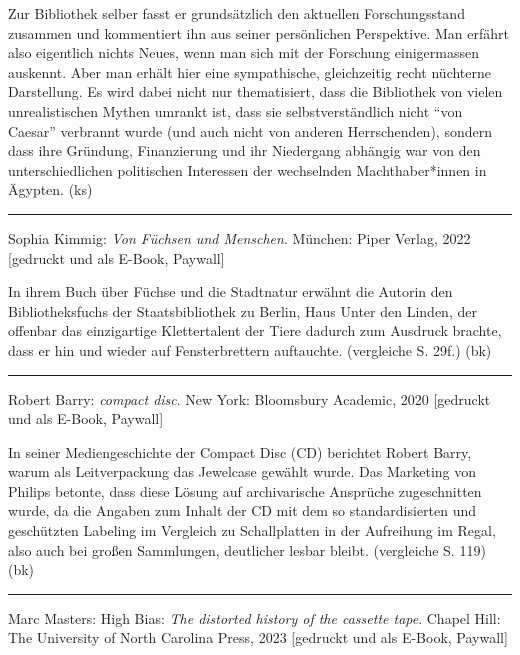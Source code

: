 \documentclass[a4paper,
fontsize=11pt,
oneside,
numbers=noperiodatend,
parskip=half-,
bibliography=totoc,
final
]{scrartcl}
\begin{document}
Zur Bibliothek selber fasst er grundsätzlich den aktuellen
Forschungsstand zusammen und kommentiert ihn aus seiner persönlichen
Perspektive. Man erfährt also eigentlich nichts Neues, wenn man sich mit
der Forschung einigermassen auskennt. Aber man erhält hier eine
sympathische, gleichzeitig recht nüchterne Darstellung. Es wird dabei
nicht nur thematisiert, dass die Bibliothek von vielen unrealistischen
Mythen umrankt ist, dass sie selbstverständlich nicht \enquote{von
Caesar} verbrannt wurde (und auch nicht von anderen Herrschenden),
sondern dass ihre Gründung, Finanzierung und ihr Niedergang abhängig war
von den unterschiedlichen politischen Interessen der wechselnden
Machthaber*innen in Ägypten. (ks)

\begin{center}\rule{0.5\linewidth}{0.5pt}\end{center}

Sophia Kimmig: \emph{Von Füchsen und Menschen}. München: Piper Verlag,
2022 {[}gedruckt und als E-Book, Paywall{]}

In ihrem Buch über Füchse und die Stadtnatur erwähnt die Autorin den
Bibliotheksfuchs der Staatsbibliothek zu Berlin, Haus Unter den Linden,
der offenbar das einzigartige Klettertalent der Tiere dadurch zum
Ausdruck brachte, dass er hin und wieder auf Fensterbrettern auftauchte.
(vergleiche S. 29f.) (bk)

\begin{center}\rule{0.5\linewidth}{0.5pt}\end{center}

Robert Barry: \emph{compact disc}. New York: Bloomsbury Academic, 2020 {[}gedruckt und als E-Book, Paywall{]}

In seiner Mediengeschichte der Compact Disc (CD) berichtet Robert Barry,
warum als Leitverpackung das Jewelcase gewählt wurde. Das Marketing von
Philips betonte, dass diese Lösung auf archivarische Ansprüche
zugeschnitten wurde, da die Angaben zum Inhalt der CD mit dem so
standardisierten und geschützten Labeling im Vergleich zu Schallplatten
in der Aufreihung im Regal, also auch bei großen Sammlungen, deutlicher
lesbar bleibt. (vergleiche S. 119) (bk)

\begin{center}\rule{0.5\linewidth}{0.5pt}\end{center}

Marc Masters: High Bias: \emph{The distorted history of the cassette
tape}. Chapel Hill: The University of North Carolina Press, 2023 {[}gedruckt und als E-Book, Paywall{]}
\end{document}

